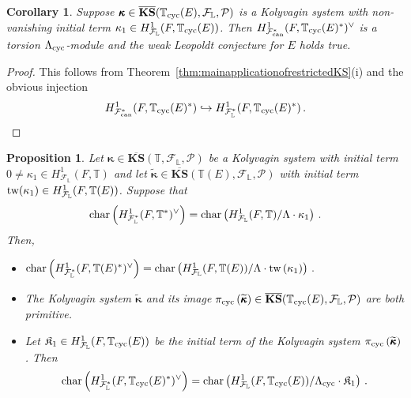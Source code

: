 \documentclass[12pt]{amsart}
\numberwithin{equation}{section}
\newtheorem{prop}[thm]{Proposition}
\newtheorem{cor}[thm]{Corollary}
\begin{document}
\begin{cor}
\label{cor:localnonvanishingimpliesweakLeoforE}
Suppose  $\pmb{\kappa}\in \overline{\mathbf{KS}}({\mathbb{T}}_{\textup{cyc}}(E),{\mathcal{F}}_{\mathbb{L}},{\mathcal{P}})$ is a Kolyvagin system with non-vanishing initial term $\kappa_1 \in H^1_{{\mathcal{F}}_{\mathbb{L}}}(F,{\mathbb{T}}_{\textup{cyc}}(E))$. Then $H^1_{{\mathcal{F}}_{\textup{can}}^*}(F,{\mathbb{T}}_{\textup{cyc}}(E)^*)^\vee$ is  a torsion ${\Lambda}_{\textup{cyc}}$-module and the weak Leopoldt conjecture for $E$ holds true.
\end{cor}
\begin{proof}
This follows from Theorem~\ref{thm:mainapplicationofrestrictedKS}(i) and the obvious injection
$$H^1_{{\mathcal{F}}_{\textup{can}}^*}(F,{\mathbb{T}}_{\textup{cyc}}(E)^*) \hookrightarrow H^1_{{\mathcal{F}}_{\mathbb{L}}^*}(F,{\mathbb{T}}_{\textup{cyc}}(E)^*) \,.$$
\end{proof}
\begin{prop}
\label{prop:usefulforequality}
Let $\pmb{\kappa}\in \overline{\mathbf{KS}}({\mathbb{T}},{\mathcal{F}}_{\mathbb{L}},{\mathcal{P}})$ be a Kolyvagin system with initial term $0\neq\kappa_1 \in H^1_{{\mathcal{F}}_{\mathbb{L}}}(F,{\mathbb{T}})$ and let $\widetilde{\pmb{\kappa}}\in \overline{\mathbf{KS}}({\mathbb{T}}(E),{\mathcal{F}}_{\mathbb{L}},{\mathcal{P}})$ with initial term $\textup{tw}(\kappa_1) \in H^1_{{\mathcal{F}}_{\mathbb{L}}}(F,{\mathbb{T}}(E))$. Suppose that 
$$\textup{char}\left(H^1_{{\mathcal{F}}_{\mathbb{L}}^*}(F,{\mathbb{T}}^*)^\vee\right)=\textup{char}\left(H^1_{{\mathcal{F}}_{\mathbb{L}}}(F,{\mathbb{T}})/{\Lambda}\cdot\kappa_1\right)\,.$$
Then,
\begin{itemize}
\item[(i)] $\textup{char}\left(H^1_{{\mathcal{F}}_{\mathbb{L}}^*}(F,{\mathbb{T}}(E)^*)^\vee\right)=\textup{char}\left(H^1_{{\mathcal{F}}_{\mathbb{L}}}(F,{\mathbb{T}}(E))/{\Lambda}\cdot\textup{tw}\left(\kappa_1\right)\right)\,.$
\item[(ii)] The Kolyvagin system $\widetilde{\pmb{\kappa}}$ and its image $\pi_{\textup{cyc}}\left(\widetilde{\pmb{\kappa}}\right) \in \overline{\mathbf{KS}}({\mathbb{T}}_{\textup{cyc}}(E),{\mathcal{F}}_{\mathbb{L}},{\mathcal{P}})$ are both primitive.
\item[(iii)] Let $\frak{K}_1\in H^1_{{\mathcal{F}}_{\mathbb{L}}}(F,{\mathbb{T}}_{\textup{cyc}}(E))$ be the initial term of the Kolyvagin system $\pi_{\textup{cyc}}\left(\widetilde{\pmb{\kappa}}\right)$. Then
$$\textup{char}\left(H^1_{{\mathcal{F}}_{\mathbb{L}}^*}(F,{\mathbb{T}}_{\textup{cyc}}(E)^*)^\vee\right)=\textup{char}\left(H^1_{{\mathcal{F}}_{\mathbb{L}}}(F,{\mathbb{T}}_{\textup{cyc}}(E))/{\Lambda}_{\textup{cyc}}\cdot\frak{K}_1\right)\,.$$
\end{itemize}
\end{prop}
\end{document}
